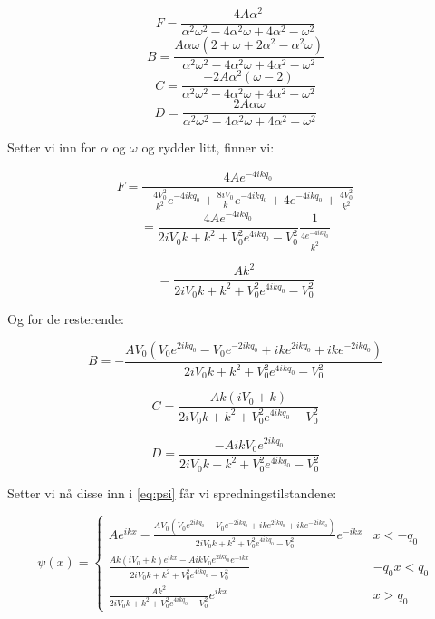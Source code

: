 \documentclass[a4paper,norsk, 10pt]{article}
\numberwithin{equation}{section}
\begin{document}
$$
F = \frac{4A\alpha^2}{\alpha^2\omega^2 - 4\alpha^2\omega + 4\alpha^2 - \omega^2}
$$
$$
B = \frac{A\alpha\omega(2+\omega +2\alpha^2 - \alpha^2\omega)}{\alpha^2\omega^2 - 4\alpha^2\omega + 4\alpha^2 - \omega^2}
$$
$$
C = \frac{-2A\alpha^2(\omega - 2)}{\alpha^2\omega^2 - 4\alpha^2\omega + 4\alpha^2 - \omega^2}
$$
$$
D = \frac{2A\alpha\omega}{\alpha^2\omega^2 - 4\alpha^2\omega + 4\alpha^2 - \omega^2}
$$

Setter vi inn for $\alpha$ og $\omega$ og rydder litt, finner vi:

$$
F = \frac{4Ae^{-4ikq_0}}{-\frac{4V_0^2}{k^2}e^{-4ikq_0} + \frac{8iV_0}{k}e^{-4ikq_0} + 4e^{-4ikq_0} + \frac{4V_0^2}{k^2}}
$$
$$
= \frac{4Ae^{-4ikq_0}}{2iV_0k + k^2 +V_0^2e^{4ikq_0} - V_0^2}\frac{1}{\frac{4e^{-4ikq_0}}{k^2}}
$$

\begin{equation}
= \frac{Ak^2}{2iV_0k + k^2 +V_0^2e^{4ikq_0} - V_0^2}
\label{eq:F}
\end{equation}

Og for de resterende:

\begin{equation}
B = -\frac{AV_0\left(V_0e^{2ikq_0} - V_0e^{-2ikq_0} + ike^{2ikq_0} + ike^{-2ikq_0}\right)}{2iV_0k + k^2 +V_0^2e^{4ikq_0} - V_0^2}
\label{eq:B}
\end{equation}

\begin{equation}
C = \frac{Ak(iV_0 + k)}{2iV_0k + k^2 +V_0^2e^{4ikq_0} - V_0^2}
\label{eq:C}
\end{equation}

\begin{equation}
D = \frac{-AikV_0e^{2ikq_0}}{2iV_0k + k^2 +V_0^2e^{4ikq_0} - V_0^2}
\label{eq:D}
\end{equation}

Setter vi nå disse inn i \ref{eq:psi} får vi spredningstilstandene:

\begin{equation}
\psi(x) =
\begin{cases}
Ae^{ikx} -\frac{AV_0\left(V_0e^{2ikq_0} - V_0e^{-2ikq_0} + ike^{2ikq_0} + ike^{-2ikq_0}\right)}{2iV_0k + k^2 +V_0^2e^{4ikq_0} - V_0^2}e^{-ikx} & x< -q_0 \\
\frac{Ak(iV_0 + k)e^{ikx} -AikV_0e^{2ikq_0}e^{-ikx}}{2iV_0k + k^2 +V_0^2e^{4ikq_0} - V_0^2} & -q_0x< q_0 \\
\frac{Ak^2}{2iV_0k + k^2 +V_0^2e^{4ikq_0} - V_0^2}e^{ikx} & x>q_0 
\end{cases}
\end{equation}
\end{document}

